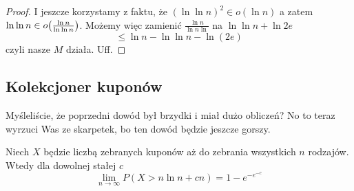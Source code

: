 \begin{proof}
	I jeszcze korzystamy z faktu, że \( (\ln \ln n)^2 \in o(\ln n) \)
	a zatem \( \ln \ln n \in o\pars{\frac{\ln n}{\ln \ln n}} \).
	Możemy więc zamienić \( \frac{\ln n}{\ln n \ln} \) na \( \ln \ln n + \ln 2e \)
	\[
		\leq \ln n - \ln \ln n - \ln (2e)
	\]
	czyli nasze \( M \) działa. Uff.
\end{proof}

\subsection{Kolekcjoner kuponów}
Myśleliście, że poprzedni dowód był brzydki i miał dużo obliczeń?
No to teraz wyrzuci Was ze skarpetek, bo ten dowód będzie jeszcze gorszy.

\begin{theorem}
	Niech \( X \) będzie liczbą zebranych kuponów aż do zebrania wszystkich \( n \) rodzajów. Wtedy dla dowolnej stałej \( c \)
	\[
		\lim_{n \rightarrow \infty} P(X > n \ln n + cn) = 1 - e^{-e^{-c}}
	\]
\end{theorem}
